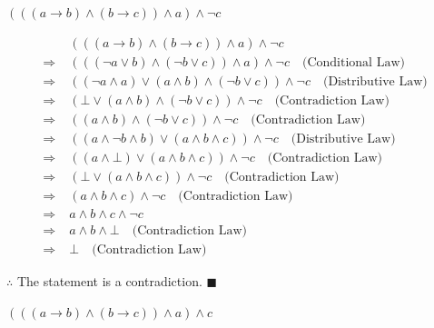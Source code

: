 \documentclass[]{article}
\begin{document}
\begin{question}
    $(((a \rightarrow b) \land (b \rightarrow c)) \land a) \land \neg c$
\end{question}
\begin{align*}
    & (((a \rightarrow b) \land (b \rightarrow c)) \land a) \land \neg c \\
    \Rightarrow\; & (((\neg a \lor b) \land (\neg b \lor c)) \land a) \land \neg c \quad \text{(Conditional Law)} \\
    \Rightarrow\; & ((\neg a \land a) \lor (a\land b) \land (\neg b \lor c)) \land \neg c \quad \text{(Distributive Law)} \\
    \Rightarrow\; & (\bot \lor (a\land b) \land (\neg b \lor c)) \land \neg c \quad \text{(Contradiction Law)} \\
    \Rightarrow\; & ((a\land b) \land (\neg b \lor c)) \land \neg c \quad \text{(Contradiction Law)} \\
    \Rightarrow\; & ((a \land \neg b \land b) \lor (a \land b \land c)) \land \neg c \quad \text{(Distributive Law)} \\
    \Rightarrow\; & ((a \land \bot) \lor (a\land b\land c)) \land \neg c \quad \text{(Contradiction Law)} \\
    \Rightarrow\; & (\bot \lor (a\land b\land c)) \land \neg c \quad \text{(Contradiction Law)} \\
    \Rightarrow\; & (a\land b\land c) \land \neg c \quad \text{(Contradiction Law)} \\
    \Rightarrow & a \land b \land c \land \neg c \quad \\
    \Rightarrow\; & a \land b \land \bot \quad \text{(Contradiction Law)} \\
    \Rightarrow\; & \bot \quad \text{(Contradiction Law)}
\end{align*}
\begin{center}
    $\therefore$ The statement is a contradiction. $\blacksquare$
\end{center}
\vspace{1.7in}
\begin{question}
    $(((a \rightarrow b) \land (b \rightarrow c)) \land a) \land  c$
\end{question}
\end{document}
